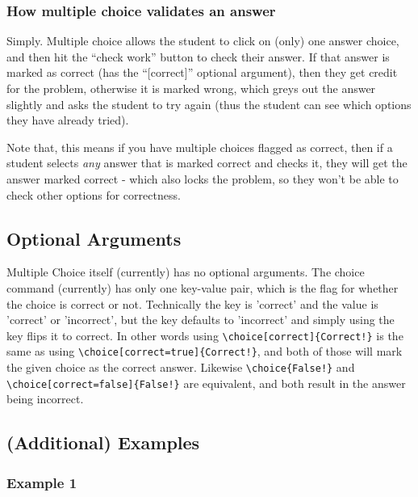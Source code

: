 \documentclass{ximera}
\begin{document}
            
        \subsubsection*{How multiple choice validates an answer}
        
            Simply. Multiple choice allows the student to click on (only) one answer choice, and then hit the ``check work'' button to check their answer. If that answer is marked as correct (has the ``[correct]'' optional argument), then they get credit for the problem, otherwise it is marked wrong, which greys out the answer slightly and asks the student to try again (thus the student can see which options they have already tried).
            
            Note that, this means if you have multiple choices flagged as correct, then if a student selects \textit{any} answer that is marked correct and checks it, they will get the answer marked correct - which also locks the problem, so they won't be able to check other options for correctness.
            
            
    
    \subsection*{Optional Arguments}
    
        Multiple Choice itself (currently) has no optional arguments. The choice command (currently) has only one key-value pair, which is the flag for whether the choice is correct or not. Technically the key is 'correct' and the value is 'correct' or 'incorrect', but the key defaults to 'incorrect' and simply using the key flips it to correct. In other words using \verb|\choice[correct]{Correct!}| is the same as using \verb|\choice[correct=true]{Correct!}|, and both of those will mark the given choice as the correct answer. Likewise \verb|\choice{False!}| and \verb|\choice[correct=false]{False!}| are equivalent, and both result in the answer being incorrect.
        
    \subsection*{(Additional) Examples}
    
        \subsubsection*{Example 1}
            
\end{document}
